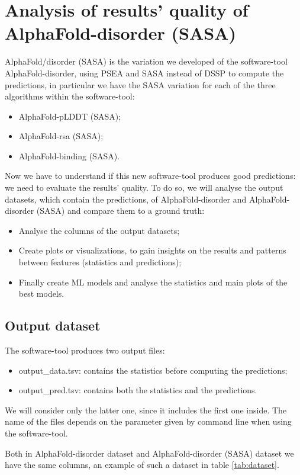 \chapter{Analysis of results' quality of AlphaFold-disorder (SASA)}
\label{chp:analysis}
AlphaFold/disorder (SASA) is the variation we developed of the software-tool AlphaFold-disorder, using PSEA and SASA instead of DSSP to compute the predictions, in particular we have the SASA variation for each of the three algorithms within the software-tool:
\begin{itemize}
    \item AlphaFold-pLDDT (SASA);
    \item AlphaFold-rsa (SASA);
    \item AlphaFold-binding (SASA).
\end{itemize}

Now we have to understand if this new software-tool produces good predictions: we need to evaluate the results' quality. To do so, we will analyse the output datasets, which contain the predictions, of AlphaFold-disorder and AlphaFold-disorder (SASA) and compare them to a ground truth:
\begin{itemize}
    \item Analyse the columns of the output datasets;
    \item Create plots or visualizations, to gain insights on the results and patterns between features (statistics and predictions);
    \item Finally create ML models and analyse the statistics and main plots of the best models.
\end{itemize}

\section{Output dataset}
The software-tool produces two output files:
\begin{itemize}
    \item output\_data.tsv: contains the statistics before computing the predictions;
    \item output\_pred.tsv: contains both the statistics and the predictions.
\end{itemize}
We will consider only the latter one, since it includes the first one inside. The name of the files depends on the parameter given by command line when using the software-tool. 

Both in AlphaFold-disorder dataset and AlphaFold-disorder (SASA) dataset we have the same columns, an example of such a dataset in table \ref{tab:dataset}.


